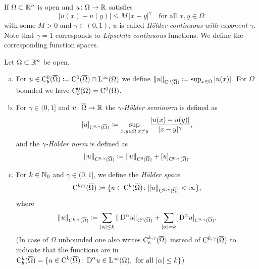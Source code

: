\setcounter{equation}{11}

If $\Omega \subset \mathbb{R}^n$ is open and $u \colon \Omega \to \mathbb{R}$ satisfies
\begin{equation}
  \label{eq:hoelderCond}
  |u(x) - u(y)| \leq M\, |x - y|^\gamma \quad\text{for all } x, y \in \Omega
\end{equation}
with some $M > 0$ and $\gamma \in (0,1)$, $u$ is called \emph{Hölder continuous with exponent $\gamma$}.
Note that $\gamma = 1$ corresponds to \emph{Lipschitz continuous} functions.
We define the corresponding function spaces.

\begin{defn}
  Let $\Omega \subset \mathbb{R}^n$ be open.
  \begin{enumerate}[a)]
    \item For $u \in \mathrm{C}_b^0(\overline\Omega) \coloneqq \mathrm{C}^0(\overline\Omega) \cap \mathrm{L}^\infty(\Omega)$ we define $\|u\|_{\mathrm{C}^0(\overline\Omega)} \coloneqq \sup_{x \in \Omega} |u(x)|$.
      For $\Omega$ bounded we have $\mathrm{C}_b^0(\overline\Omega) = \mathrm{C}^0(\overline\Omega)$.

    \item For $\gamma \in (0,1]$ and $u \colon \overline\Omega \to \mathbb{R}$ the \emph{$\gamma$-Hölder seminorm} is defined as
    $$
    [u]_{\mathrm{C}^{0,\gamma}(\overline\Omega)} \coloneqq \sup_{x,y \in \Omega, x \neq y} \frac{|u(x)  - u(y)|}{|x - y|^\gamma},
    $$
    and the \emph{$\gamma$-Hölder norm} is defined as 
    $$
    \|u\|_{\mathrm{C}^{0,\gamma}(\overline\Omega)} \coloneqq \| u\|_{\mathrm{C}^0(\overline\Omega)} + [u]_{\mathrm{C}^{0,\gamma}(\overline\Omega)}.
    $$

    \item For $k \in \mathbb{N}_0$ and $\gamma \in (0,1]$, we define the \emph{Hölder space}
      $$
      \mathrm{C}^{k,\gamma}(\overline\Omega) \coloneqq \{ u \in \mathrm{C}^k(\overline\Omega) \colon \|u\|_{\mathrm{C}^{k,\gamma}(\overline\Omega)} < \infty \},
      $$
      where
      $$
      \| u\|_{\mathrm{C}^{k,\gamma}(\overline\Omega)} \coloneqq \sum_{|\alpha| \leq k} \|\,{\operatorname{D}}^\alpha u\|_{\mathrm{C}^0(\overline\Omega)} + \sum_{|\alpha| = k} [\,{\operatorname{D}}^\alpha u]_{\mathrm{C}^{0,\gamma}(\overline\Omega)}.
      $$
      (In case of $\Omega$ unbounded one also writes $\mathrm{C}_b^{k,\gamma}(\overline\Omega)$ instead of $\mathrm{C}^{k,\gamma}(\overline\Omega)$ to indicate that the functions are in $\mathrm{C}_b^k(\overline\Omega) = \{ u \in \mathrm{C}^k(\overline\Omega) \colon \,{\operatorname{D}}^\alpha u \in \mathrm{L}^\infty(\Omega), \text{ for all } |\alpha| \leq k \}$)
  \end{enumerate}
\end{defn}


